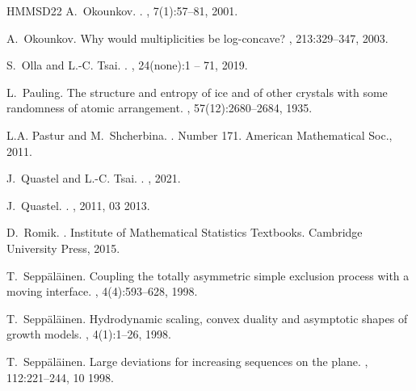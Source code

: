 \documentclass[reqno,11pt]{amsart}
\numberwithin{equation}{section}
\theoremstyle{definition}
\begin{document}
\begin{thebibliography}{HMMSD22}
A.~Okounkov.
.
, 7(1):57--81, 2001.

A.~Okounkov.
\newblock Why would multiplicities be log-concave?
, 213:329–347, 2003.

S.~Olla and L.-C. Tsai.
.
, 24(none):1 -- 71, 2019.

L.~Pauling.
\newblock The structure and entropy of ice and of other crystals with some randomness of atomic arrangement.
, 57(12):2680--2684, 1935.

L.A. Pastur and M.~Shcherbina.
.
\newblock Number 171. American Mathematical Soc., 2011.

J.~Quastel and L.-C. Tsai.
.
, 2021.

J.~Quastel.
.
, 2011, 03 2013.

D.~Romik.
.
\newblock Institute of Mathematical Statistics Textbooks. Cambridge University Press, 2015.

T.~Sepp{\"a}l{\"a}inen.
\newblock Coupling the totally asymmetric simple exclusion process with a moving interface.
, 4(4):593--628, 1998.

T.~Sepp\"{a}l\"{a}inen.
\newblock Hydrodynamic scaling, convex duality and asymptotic shapes of growth models.
, 4(1):1--26, 1998.

T.~Sepp{\"a}l{\"a}inen.
\newblock Large deviations for increasing sequences on the plane.
, 112:221--244, 10 1998.


\end{thebibliography}
\end{document}
